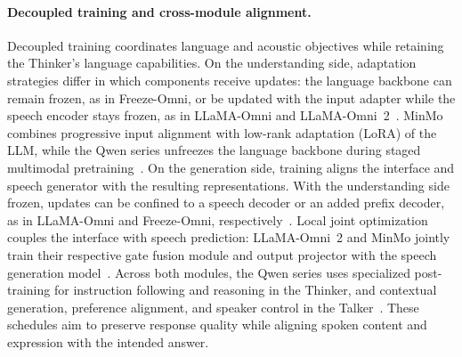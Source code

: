 \paragraph{Decoupled training and cross-module alignment.}
Decoupled training coordinates language and acoustic objectives while retaining the Thinker's language capabilities. On the understanding side, adaptation strategies differ in which components receive updates: the language backbone can remain frozen, as in Freeze-Omni, or be updated with the input adapter while the speech encoder stays frozen, as in LLaMA-Omni and LLaMA-Omni~2~\citep{DBLP:conf/icml/WangLFZS000M25,DBLP:conf/iclr/FangGZMZ025,DBLP:journals/corr/abs-2505-02625}. MinMo combines progressive input alignment with low-rank adaptation (LoRA) of the LLM, while the Qwen series unfreezes the language backbone during staged multimodal pretraining~\citep{DBLP:journals/corr/abs-2501-06282,DBLP:journals/corr/abs-2503-20215,DBLP:journals/corr/abs-2509-17765,DBLP:journals/corr/abs-2604-15804}. On the generation side, training aligns the interface and speech generator with the resulting representations. With the understanding side frozen, updates can be confined to a speech decoder or an added prefix decoder, as in LLaMA-Omni and Freeze-Omni, respectively~\citep{DBLP:conf/iclr/FangGZMZ025,DBLP:conf/icml/WangLFZS000M25}. Local joint optimization couples the interface with speech prediction: LLaMA-Omni~2 and MinMo jointly train their respective gate fusion module and output projector with the speech generation model~\citep{DBLP:journals/corr/abs-2505-02625,DBLP:journals/corr/abs-2501-06282}. Across both modules, the Qwen series uses specialized post-training for instruction following and reasoning in the Thinker, and contextual generation, preference alignment, and speaker control in the Talker~\citep{DBLP:journals/corr/abs-2503-20215,DBLP:journals/corr/abs-2509-17765,DBLP:journals/corr/abs-2604-15804}. These schedules aim to preserve response quality while aligning spoken content and expression with the intended answer.

